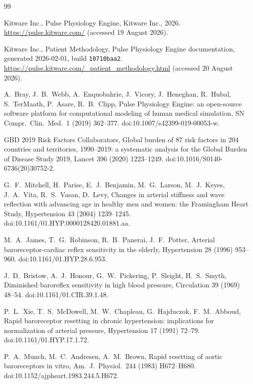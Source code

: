 \documentclass[preprint,12pt,nopreprintline]{elsarticle}
\begin{document}
\clearpage
\begin{thebibliography}{99}

  Kitware Inc., Pulse Physiology Engine,
  Kitware Inc., 2026.
  \url{https://pulse.kitware.com/} (accessed 19 August 2026).

  Kitware Inc.,
  Patient Methodology, Pulse Physiology Engine documentation,
  generated 2026-02-01, build \texttt{10710baa2}.
  \url{https://pulse.kitware.com/_patient_methodology.html}
  (accessed 20 August 2026).

  A.~Bray, J.~B.~Webb, A.~Enquobahrie, J.~Vicory, J.~Heneghan, R.~Hubal,
  S.~TerMaath, P.~Asare, R.~B.~Clipp,
  Pulse Physiology Engine: an open-source software platform for computational modeling of human medical simulation,
  SN Compr.\ Clin.\ Med.\ 1 (2019) 362--377. doi:10.1007/s42399-019-00053-w.

  GBD 2019 Risk Factors Collaborators,
  Global burden of 87 risk factors in 204 countries and territories, 1990--2019: a systematic analysis for the Global Burden of Disease Study 2019,
  Lancet 396 (2020) 1223--1249. doi:10.1016/S0140-6736(20)30752-2.

  G.~F.~Mitchell, H.~Parise, E.~J.~Benjamin, M.~G.~Larson, M.~J.~Keyes,
  J.~A.~Vita, R.~S.~Vasan, D.~Levy,
  Changes in arterial stiffness and wave reflection with advancing age in healthy men and women: the Framingham Heart Study,
  Hypertension 43 (2004) 1239--1245. doi:10.1161/01.HYP.0000128420.01881.aa.

  M.~A.~James, T.~G.~Robinson, R.~B.~Panerai, J.~F.~Potter,
  Arterial baroreceptor-cardiac reflex sensitivity in the elderly,
  Hypertension 28 (1996) 953--960. doi:10.1161/01.HYP.28.6.953.

  J.~D.~Bristow, A.~J.~Honour, G.~W.~Pickering, P.~Sleight, H.~S.~Smyth,
  Diminished baroreflex sensitivity in high blood pressure,
  Circulation 39 (1969) 48--54. doi:10.1161/01.CIR.39.1.48.

  P.~L.~Xie, T.~S.~McDowell, M.~W.~Chapleau, G.~Hajduczok, F.~M.~Abboud,
  Rapid baroreceptor resetting in chronic hypertension: implications for normalization of arterial pressure,
  Hypertension 17 (1991) 72--79. doi:10.1161/01.HYP.17.1.72.

  P.~A.~Munch, M.~C.~Andresen, A.~M.~Brown,
  Rapid resetting of aortic baroreceptors in vitro,
  Am.\ J.\ Physiol.\ 244 (1983) H672--H680. doi:10.1152/ajpheart.1983.244.5.H672.


\end{thebibliography}
\end{document}
